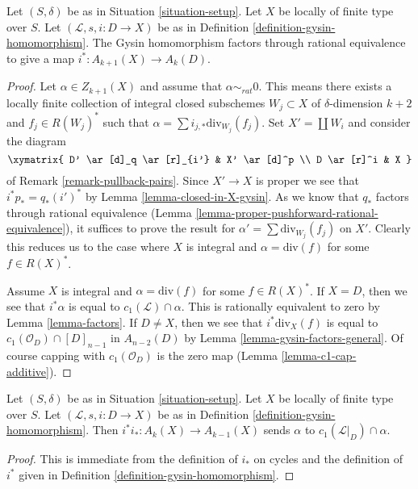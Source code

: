 \begin{lemma}
\label{lemma-gysin-factors}
Let $(S, \delta)$ be as in Situation \ref{situation-setup}.
Let $X$ be locally of finite type over $S$.
Let $(\mathcal{L}, s, i : D \to X)$ be as in
Definition \ref{definition-gysin-homomorphism}.
The Gysin homomorphism factors through rational equivalence to
give a map $i^* : A_{k + 1}(X) \to A_k(D)$.
\end{lemma}

\begin{proof}
Let $\alpha \in Z_{k + 1}(X)$ and assume that $\alpha \sim_{rat} 0$.
This means there exists a locally finite collection of integral
closed subschemes $W_j \subset X$ of $\delta$-dimension $k + 2$
and $f_j \in R(W_j)^*$ such that
$\alpha = \sum i_{j, *}\text{div}_{W_j}(f_j)$.
Set $X' = \coprod W_i$ and consider the diagram
$$
\xymatrix{
D' \ar[d]_q \ar[r]_{i'} & X' \ar[d]^p \\
D \ar[r]^i & X
}
$$
of Remark \ref{remark-pullback-pairs}. Since $X' \to X$ is proper
we see that $i^*p_* = q_*(i')^*$ by Lemma \ref{lemma-closed-in-X-gysin}.
As we know that $q_*$ factors through rational equivalence
(Lemma \ref{lemma-proper-pushforward-rational-equivalence}), it suffices
to prove the result for $\alpha' = \sum \text{div}_{W_j}(f_j)$
on $X'$. Clearly this reduces us to the case where $X$ is integral
and $\alpha = \text{div}(f)$ for some $f \in R(X)^*$.

\medskip\noindent
Assume $X$ is integral and $\alpha = \text{div}(f)$ for some $f \in R(X)^*$.
If $X = D$, then we see that $i^*\alpha$ is equal
to $c_1(\mathcal{L}) \cap \alpha$.
This is rationally equivalent to zero by Lemma \ref{lemma-factors}.
If $D \not = X$, then we see that $i^*\text{div}_X(f)$ is equal to
$c_1(\mathcal{O}_D) \cap [D]_{n - 1}$ in $A_{n - 2}(D)$ by
Lemma \ref{lemma-gysin-factors-general}. Of course
capping with $c_1(\mathcal{O}_D)$ is the zero map
(Lemma \ref{lemma-c1-cap-additive}).
\end{proof}

\begin{lemma}
\label{lemma-gysin-back}
Let $(S, \delta)$ be as in Situation \ref{situation-setup}. Let $X$ be locally
of finite type over $S$. Let $(\mathcal{L}, s, i : D \to X)$ be as in
Definition \ref{definition-gysin-homomorphism}. Then
$i^*i_* : A_k(X) \to A_{k - 1}(X)$ sends $\alpha$ to
$c_1(\mathcal{L}|_D) \cap \alpha$.
\end{lemma}

\begin{proof}
This is immediate from the definition of $i_*$ on cycles
and the definition of $i^*$ given in
Definition \ref{definition-gysin-homomorphism}.
\end{proof}

